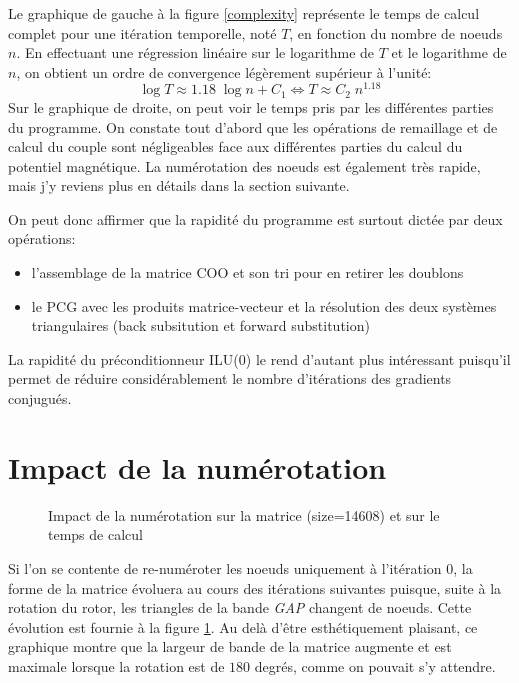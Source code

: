 \documentclass[11 pt]{article}
\begin{document}
Le graphique de gauche à la figure \ref{complexity} représente le temps de calcul complet pour une itération temporelle, noté $T$, en fonction du nombre de noeuds $n$. En effectuant une régression linéaire sur le logarithme de $T$ et le logarithme de $n$, on obtient un ordre de convergence légèrement supérieur à l'unité:
\[\log{T} \approx 1.18 \; \log{n} + C_1 \iff T \approx C_2 \; n^{1.18}\]
Sur le graphique de droite, on peut voir le temps pris par les différentes parties du programme. On constate tout d'abord que les opérations de remaillage et de calcul du couple sont négligeables face aux différentes parties du calcul du potentiel magnétique. La numérotation des noeuds est également très rapide, mais j'y reviens plus en détails dans la section suivante.

On peut donc affirmer que la rapidité du programme est surtout dictée par deux opérations:
\begin{itemize}
    \item l'assemblage de la matrice COO et son tri pour en retirer les doublons
    \item le PCG avec les produits matrice-vecteur et la résolution des deux systèmes triangulaires (back subsitution et forward substitution)
\end{itemize}

La rapidité du préconditionneur ILU(0) le rend d'autant plus intéressant puisqu'il permet de réduire considérablement le nombre d'itérations des gradients conjugués.


\section{Impact de la numérotation}
\begin{figure}[!ht]
    \centering
    \begin{subfigure}[t]{0.44\textwidth}
        \centering
        
    \end{subfigure}
    \hspace{0.5em}
    \begin{subfigure}[t]{0.44\textwidth}
        \centering
        
    \end{subfigure}
    \caption{Impact de la numérotation sur la matrice (size=14608) et sur le temps de calcul}
    \label{numbering}
\end{figure}

Si l'on se contente de re-numéroter les noeuds uniquement à l'itération $0$, la forme de la matrice évoluera au cours des itérations suivantes puisque, suite à la rotation du rotor, les triangles de la bande \textit{GAP} changent de noeuds. Cette évolution est fournie à la figure \ref{numbering}. Au delà d'être esthétiquement plaisant, ce graphique montre que la largeur de bande de la matrice augmente et est maximale lorsque la rotation est de $180$ degrés, comme on pouvait s'y attendre.
\end{document}
